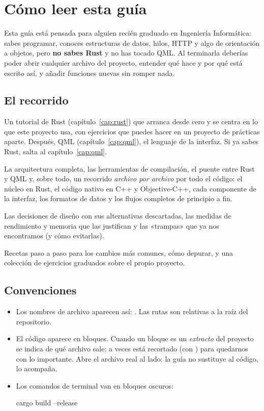 \chapter{Cómo leer esta guía}

Esta guía está pensada para alguien recién graduado en Ingeniería Informática: sabes
programar, conoces estructuras de datos, hilos, HTTP y algo de orientación a objetos, pero
\textbf{no sabes Rust} y no has tocado QML. Al terminarla deberías poder abrir cualquier
archivo del proyecto, entender qué hace y por qué está escrito así, y añadir funciones nuevas
sin romper nada.

\section{El recorrido}

\begin{description}[style=nextline, leftmargin=0pt]
  \item[Parte I. Empezar con buen pie] Un tutorial de Rust (capítulo~\ref{cap:rust}) que
  arranca desde cero y se centra en lo que este proyecto usa, con ejercicios que puedes hacer
  en un proyecto de prácticas aparte. Después, QML (capítulo~\ref{cap:qml}), el lenguaje de la
  interfaz. Si ya sabes Rust, salta al capítulo~\ref{cap:qml}.
  \item[Parte II. Cómo está hecho] La arquitectura completa, las herramientas de compilación,
  el puente entre Rust y QML y, sobre todo, un recorrido \emph{archivo por archivo} por todo el
  código: el núcleo en Rust, el código nativo en C++ y Objective-C++, cada componente de la
  interfaz, los formatos de datos y los flujos completos de principio a fin.
  \item[Parte III. Por qué está así] Las decisiones de diseño con sus alternativas
  descartadas, las medidas de rendimiento y memoria que las justifican y las «trampas» que ya
  nos encontramos (y cómo evitarlas).
  \item[Parte IV. Desarrollar por tu cuenta] Recetas paso a paso para los cambios más comunes,
  cómo depurar, y una colección de ejercicios graduados sobre el propio proyecto.
\end{description}

\section{Convenciones}

\begin{itemize}
  \item Los nombres de archivo aparecen así: . Las rutas son relativas a
  la raíz del repositorio.
  \item El código aparece en bloques. Cuando un bloque es un \emph{extracto} del proyecto se
  indica de qué archivo sale; a veces está recortado (con ) para quedarnos con lo
  importante. Abre el archivo real al lado: la guía no sustituye al código, lo acompaña.
  \item Los comandos de terminal van en bloques oscuros:
\begin{terminal}
cargo build --release
\end{terminal}
\end{itemize}

